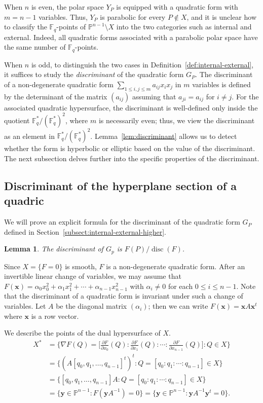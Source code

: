 \documentclass[12pt,reqno]{amsart}
\newtheorem{lem}[thm]{Lemma}
\theoremstyle{definition}
\newcommand{\F}{\mathbb{F}}
\newcommand{\disc}{\operatorname{disc}}
\begin{document}
When $n$ is even, the polar space $Y_P$ is equipped with a quadratic form with $m=n-1$ variables. Thus, $Y_P$ is parabolic for every $P\notin X$, and it is unclear how to classify the $\F_q$-points of $\mathbb{P}^{n-1}\setminus X$ into the two categories such as internal and external. Indeed, all quadratic forms associated with a parabolic polar space have the same number of $\F_q$-points.

When $n$ is odd, to distinguish the two cases in Definition~\ref{def:internal-external}, it suffices to study the \emph{discriminant} of the quadratic form $G_P$. The discriminant of a non-degenerate quadratic form $\sum_{1\leq i, j\leq m} a_{ij} x_i x_j$ in $m$ variables is defined by the determinant of the matrix $(a_{ij})$ assuming that $a_{ji}=a_{ij}$ for $i\neq j$. For the associated quadratic hypersurface, the discriminant is well-defined only inside the quotient $\F^{\ast}_{q}/(\F^{\ast}_q)^2$, where $m$ is necessarily even; thus, we view the discriminant as an element in $\F^{\ast}_{q}/(\F^{\ast}_q)^2$. Lemma~\ref{lem:discriminant} allows us to detect whether the form is hyperbolic or elliptic based on the value of the discriminant. The next subsection delves further into the specific properties of the discriminant. 

\subsection{Discriminant of the hyperplane section of a quadric}

We will prove an explicit formula for the discriminant of the quadratic form $G_P$ defined in Section~\ref{subsect:internal-external-higher}.

\begin{lem}\label{lem:G_p}
The discriminant of $G_p$ is $F(P)/\disc(F)$.
\end{lem}

Since $X=\{F=0\}$ is smooth, $F$ is a non-degenerate quadratic form. After an invertible linear change of variables, we may assume that $F(\mathbf{x})=\alpha_0 x_0^2+\alpha_1x_1^2+\cdots+\alpha_{n-1}x_{n-1}^2$ \cite[equation (1.1)]{Y24} with $\alpha_i \neq 0$ for each $0 \leq i \leq n-1$. Note that the discriminant of a quadratic form is invariant under such a change of variables. Let $A$ be the diagonal matrix $(\alpha_i)$; then we can write $F(\mathbf{x})=\mathbf{x}A\mathbf{x}^t$ where $\mathbf{x}$ is a row vector.

We describe the points of the dual hypersurface of $X$. 
\begin{align*}
X^*
&=\bigg\{\nabla F (Q)=\bigg[\frac{\partial F}{\partial x_0}(Q): \frac{\partial F}{\partial x_1}(Q): \cdots: \frac{\partial F}{\partial x_{n-1}}(Q)\bigg]: Q \in X\bigg\}\\
&=\{(A[q_0, q_1, \ldots, q_{n-1}]^t)^t: Q=[q_0:q_1:\cdots:q_{n-1}] \in X\}\\ 
&=\{[q_0, q_1, \ldots, q_{n-1}] A: Q=[q_0:q_1:\cdots:q_{n-1}] \in X\}\\ 
&=\{\mathbf{y} \in \mathbb{P}^{n-1}: F(\mathbf{y}A^{-1})=0\}=\{\mathbf{y} \in \mathbb{P}^{n-1}: \mathbf{y}A^{-1}\mathbf{y}^t=0\}.
\end{align*}
\end{document}
